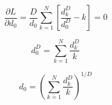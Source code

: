 \documentclass{article}
\theoremstyle{definition}
\theoremstyle{remark}
\begin{document}
\begin{equation}
\dfrac{\partial L}{ \partial d_{0}} = \dfrac{D}{d_{0}}\sum_{k=1}^{N} \left[ \dfrac{d_{k}^{D}}{d_{0}^{D}} - {k} \right] = 0
\end{equation}

\begin{equation}
{d_{0}^{D}} = \sum_{k=1}^{N} \dfrac{d_{k}^{D}}{k} 
\end{equation}

\begin{equation}
d_{0} = \left( \sum_{k=1}^{N} \dfrac{d_{k}^{D}}{k} \right)^{1/D} 
\end{equation}




\end{document}
